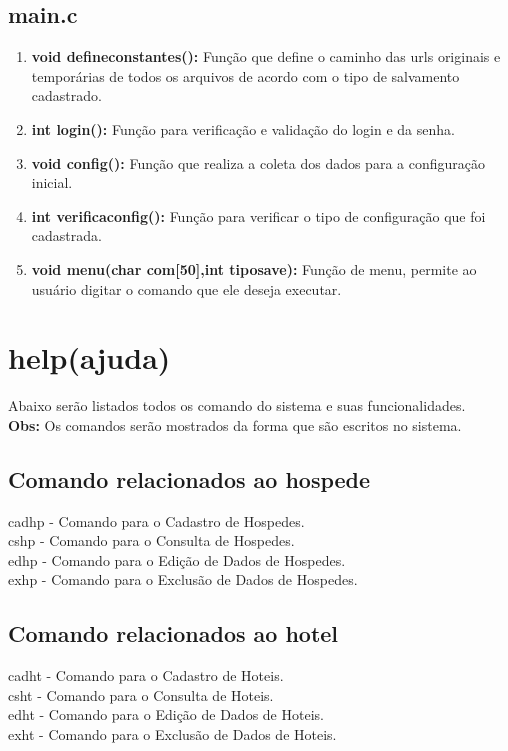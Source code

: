 \documentclass{article}
\begin{document}
\subsection{main.c}
\begin{enumerate}
	\item \textbf{void defineconstantes(): }Função que define o caminho das urls originais e temporárias de todos os arquivos de acordo com o tipo de salvamento cadastrado.\\
	\item \textbf{int login(): }Função para verificação e validação do login e da senha.\\
	\item \textbf{void config(): }Função que realiza a coleta dos dados para a configuração inicial.\\
	\item \textbf{int verificaconfig(): }Função para verificar o tipo de configuração que foi cadastrada.\\
	\item \textbf{void menu(char com[50],int tiposave): }Função de menu, permite ao usuário digitar o comando que ele deseja executar.\\
\end{enumerate}
\section{help(ajuda)}
	Abaixo serão listados todos os comando do sistema e suas funcionalidades.\\
	\textbf{Obs: }Os comandos serão mostrados da forma que são escritos no sistema.\\
	\subsection{Comando relacionados ao hospede}
	\textbullet cadhp - Comando para o Cadastro de Hospedes.\\
	\textbullet cshp - Comando para o Consulta de Hospedes.\\
	\textbullet edhp - Comando para o Edição de Dados de Hospedes.\\
	\textbullet exhp - Comando para o Exclusão de Dados de Hospedes.\\
	\subsection{Comando relacionados ao hotel}
	\textbullet cadht - Comando para o Cadastro de Hoteis.\\
	\textbullet csht - Comando para o Consulta de Hoteis.\\
	\textbullet edht - Comando para o Edição de Dados de Hoteis.\\
	\textbullet exht - Comando para o Exclusão de Dados de Hoteis.\\
\end{document}
